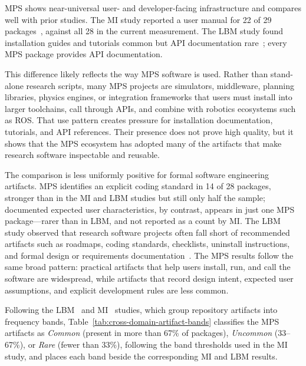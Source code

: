 MPS shows near-universal user- and developer-facing infrastructure and compares well with prior studies. The MI study reported a user manual for 22 of 29 packages~\citep{Smith2024MI}, against all 28 in the current measurement. The LBM study found installation guides and tutorials common but API documentation rare~\citep{Smith2024LBM}; every MPS package provides API documentation.

This difference likely reflects the way MPS software is used. Rather than stand-alone research scripts, many MPS projects are simulators, middleware, planning libraries, physics engines, or integration frameworks that users must install into larger toolchains, call through APIs, and combine with robotics ecosystems such as ROS. That use pattern creates pressure for installation documentation, tutorials, and API references. Their presence does not prove high quality, but it shows that the MPS ecosystem has adopted many of the artifacts that make research software inspectable and reusable.

The comparison is less uniformly positive for formal software engineering artifacts. MPS identifies an explicit coding standard in 14 of 28 packages, stronger than in the MI and LBM studies but still only half the sample; documented expected user characteristics, by contrast, appears in just one MPS package---rarer than in LBM, and not reported as a count by MI. The LBM study observed that research software projects often fall short of recommended artifacts such as roadmaps, coding standards, checklists, uninstall instructions, and formal design or requirements documentation~\citep{Smith2024LBM}. The MPS results follow the same broad pattern: practical artifacts that help users install, run, and call the software are widespread, while artifacts that record design intent, expected user assumptions, and explicit development rules are less common.

Following the LBM~\citep{Smith2024LBM} and MI~\citep{Smith2024MI} studies, which group repository artifacts into frequency bands, Table~\ref{tab:cross-domain-artifact-bands} classifies the MPS artifacts as \emph{Common} (present in more than 67\% of packages), \emph{Uncommon} (33--67\%), or \emph{Rare} (fewer than 33\%), following the band thresholds used in the MI study, and places each band beside the corresponding MI and LBM results.

